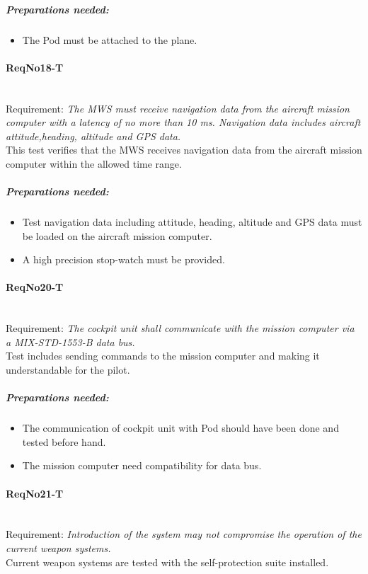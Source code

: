 	\subparagraph{Preparations needed:}
	\begin{itemize}
	\item The Pod must be attached to the plane.
	\end{itemize}


\paragraph{ReqNo18-T}\mbox{}\\ %
Requirement: \textit{The MWS must receive navigation data from the aircraft mission computer with a latency of no more than
10 ms. Navigation data includes aircraft attitude,heading, altitude and GPS data.}\\

This test verifies that the MWS receives navigation data from the aircraft mission computer within the allowed time range.

	\subparagraph{Preparations needed:}
	\begin{itemize}
	\item Test navigation data including attitude, heading, altitude and GPS data must be loaded on the aircraft mission computer.
	\item A high precision stop-watch must be provided.
	\end{itemize}

\paragraph{ReqNo20-T}\mbox{}\\ %
Requirement: \textit{The cockpit unit shall communicate with the mission computer via a MIX-STD-1553-B data bus.}\\
Test includes sending commands to the mission computer and making it understandable for the pilot.
	\subparagraph{Preparations needed:}
	\begin{itemize}
	\item The communication of cockpit unit with Pod should have been done and tested before hand.
	\item The mission computer need compatibility for data bus.
	\end{itemize}

\paragraph{ReqNo21-T}\mbox{}\\ %
Requirement: \textit{Introduction of the system may not compromise the operation of the current weapon systems.}
\\
Current weapon systems are tested with the self-protection suite installed.

